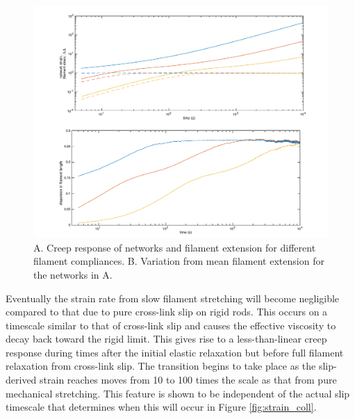 \documentclass[pre,preprint]{revtex4-1}
\begin{document}
\begin{figure}[h!]
\centering
\includegraphics[width=\hsize]{glass_relax}
\caption{\label{fig:glass_relax} A. Creep response of networks and filament extension for different filament compliances.  B. Variation from mean filament extension for the networks in A. }
\end{figure}



Eventually the strain rate from slow filament stretching will become negligible compared to that due to pure cross-link slip on rigid rods.  This occurs on a timescale similar to that of cross-link slip and causes the effective viscosity to decay back toward the rigid limit.  This gives rise to a less-than-linear creep response during times after the initial elastic relaxation but before full filament relaxation from cross-link slip.   The transition begins to take place as the slip-derived strain reaches moves from 10 to 100 times the scale as that from pure mechanical stretching.  This feature is shown to be independent of the actual slip timescale that determines when this will occur in Figure \ref{fig:strain_coll}.
\end{document}
